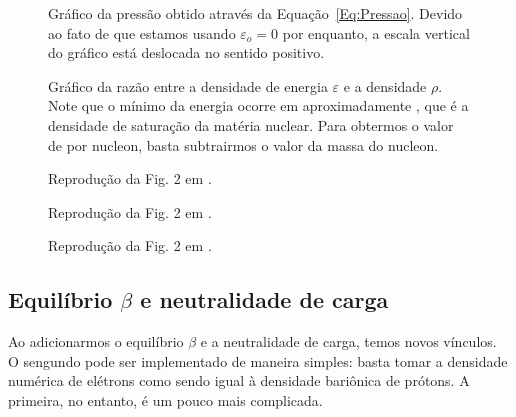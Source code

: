 \begin{figure}
	
	\caption{Gráfico da pressão obtido através da Equação~\eqref{Eq:Pressao}. Devido ao fato de que estamos usando $\varepsilon_o = 0$ por enquanto, a escala vertical do gráfico está deslocada no sentido positivo. \protect}
	\label{Fig:pressure_graph_eNJL1m}
\end{figure}

\begin{figure}
	
	\caption{Gráfico da razão entre a densidade de energia $\varepsilon$ e a densidade $\rho$. Note que o mínimo da energia ocorre em aproximadamente , que é a densidade de saturação da matéria nuclear. Para obtermos o valor de  por nucleon, basta subtrairmos o valor da massa do nucleon. \protect}
	\label{Fig:energy_by_nucleon_graph_eNJL1m}
\end{figure}

\begin{figure}
	
	\caption{Reprodução da Fig. 2 em \textcite{Pais}.}
	\label{Fig:Rep_Pais_Mass}
\end{figure}

\begin{figure}
	
	\caption{Reprodução da Fig. 2 em \textcite{Pais}.}
	\label{Fig:Rep_Pais_Pressure}
\end{figure}

\begin{figure}
	
	\caption{Reprodução da Fig. 2 em \textcite{Pais}.}
	\label{Fig:Rep_Pais_Energy_Dens}
\end{figure}

\FloatBarrier

\subsection{Equilíbrio $\beta$ e neutralidade de carga}

Ao adicionarmos o equilíbrio $\beta$ e a neutralidade de carga, temos novos vínculos. O sengundo pode ser implementado de maneira simples: basta tomar a densidade numérica de elétrons como sendo igual à densidade bariônica de prótons. A primeira, no entanto, é um pouco mais complicada. 

